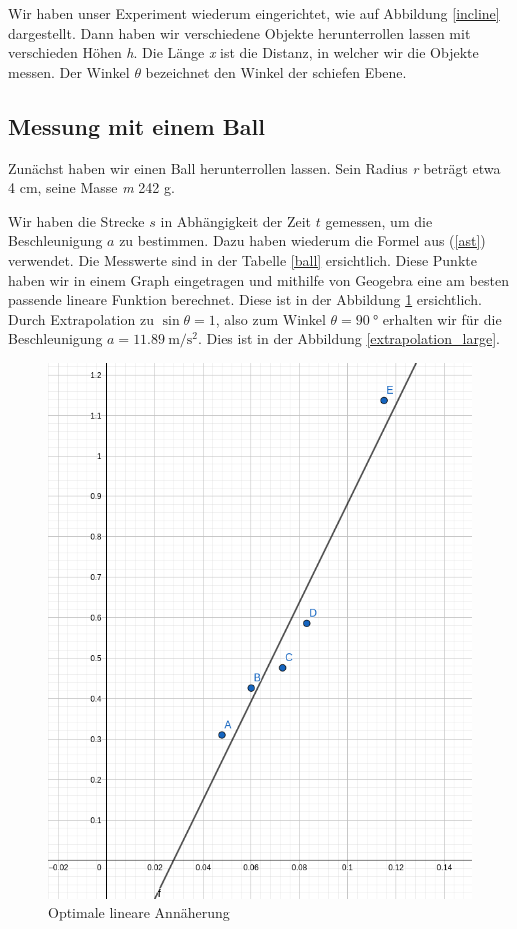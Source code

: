 \documentclass[a4paper, titlepage]{article}
\newcommand{\accunit}[1]{\SI{#1}{\metre\per\square\second}}
\begin{document}
    Wir haben unser Experiment wiederum eingerichtet, wie auf Abbildung
    \ref{incline} dargestellt. Dann haben wir verschiedene Objekte
    herunterrollen lassen mit verschieden Höhen
    \emph{h}. Die Länge \emph{x} ist die Distanz, in welcher
    wir die Objekte messen. Der Winkel $\theta$ bezeichnet
    den Winkel der schiefen Ebene.

    \subsection{Messung mit einem Ball}
    Zunächst haben wir einen Ball herunterrollen lassen.
    Sein Radius \emph{r} beträgt etwa 4 cm, seine Masse
    \emph{m} 242 g.
    
    Wir haben die Strecke $s$ in Abhängigkeit
    der Zeit $t$ gemessen, um die Beschleunigung
    $a$ zu bestimmen. Dazu haben wiederum die Formel
    aus (\ref{ast}) verwendet.
    Die Messwerte sind in der Tabelle \ref{ball}
    ersichtlich. Diese Punkte haben wir in einem
    Graph eingetragen und mithilfe von Geogebra
    eine am besten passende lineare Funktion berechnet.
    Diese ist in der Abbildung \ref{extrapolation_small}
    ersichtlich. Durch Extrapolation zu 
    $\sin{\theta} = 1$, also zum Winkel 
    $\theta = \SI{90}{\degree}$ erhalten wir für
    die Beschleunigung $a = \accunit{11.89}$. Dies 
    ist in der Abbildung \ref{extrapolation_large}.

    \begin{figure}
        \includegraphics[width=\textwidth]{images/extrapolation_small.png}
        \caption{Optimale lineare Annäherung}
        \label{extrapolation_small}
    \end{figure}
\end{document}
